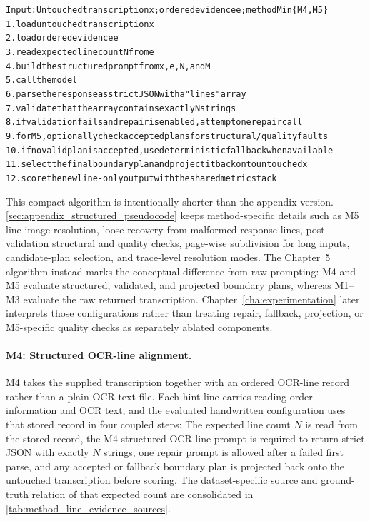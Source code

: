 \begin{algorithm}[htbp]
  \caption{Concise structured post-correction pipeline for M4/M5.}
  \label{alg:method_structured_post_correction}
  \begin{minipage}{0.96\linewidth}
    \footnotesize
\begin{alltt}
Input: Untouched transcription x; ordered evidence e; method M in \{M4,M5\}
1. load untouched transcription x
2. load ordered evidence e
3. read expected line count N from e
4. build the structured prompt from x, e, N, and M
5. call the model
6. parse the response as strict JSON with a "lines" array
7. validate that the array contains exactly N strings
8. if validation fails and repair is enabled, attempt one repair call
9. for M5, optionally check accepted plans for structural/quality faults
10. if no valid plan is accepted, use deterministic fallback when available
11. select the final boundary plan and project it back onto untouched x
12. score the newline-only output with the shared metric stack
\end{alltt}
  \end{minipage}
\end{algorithm}

This compact algorithm is intentionally shorter than the appendix version. \autoref{sec:appendix_structured_pseudocode} keeps method-specific details such as M5 line-image resolution, loose recovery from malformed response lines, post-validation structural and quality checks, page-wise subdivision for long inputs, candidate-plan selection, and trace-level resolution modes. The Chapter~5 algorithm instead marks the conceptual difference from raw prompting: M4 and M5 evaluate structured, validated, and projected boundary plans, whereas M1--M3 evaluate the raw returned transcription. Chapter~\ref{cha:experimentation} later interprets those configurations rather than treating repair, fallback, projection, or M5-specific quality checks as separately ablated components.

\paragraph{M4: Structured OCR-line alignment.}
\label{sec:method_m4}
M4 takes the supplied transcription together with an ordered OCR-line record rather than a plain OCR text file. Each hint line carries reading-order information and OCR text, and the evaluated handwritten configuration uses that stored record in four coupled steps: The expected line count \(N\) is read from the stored record, the M4 structured OCR-line prompt is required to return strict JSON with exactly \(N\) strings, one repair prompt is allowed after a failed first parse, and any accepted or fallback boundary plan is projected back onto the untouched transcription before scoring. The dataset-specific source and ground-truth relation of that expected count are consolidated in \autoref{tab:method_line_evidence_sources}.

